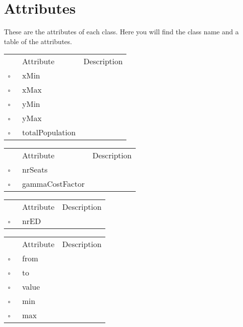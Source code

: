 \chapter{Attributes}
These are the attributes of each class. Here you will find the class name and a table of the attributes.     
\begin{table}
\caption{Area  }

\begin{longtable}{llp{8cm}}
& Attribute & Description \\
$\square$\ & xMin &  \\
$\square$\ & xMax &  \\
$\square$\ & yMin &  \\
$\square$\ & yMax &  \\
$\square$\ & totalPopulation &  \\
\end{longtable}
\label{attr:Area}
\end{table}

\clearpage
\begin{table}
\caption{ConstituencyType  }

\begin{longtable}{llp{8cm}}
& Attribute & Description \\
$\square$\ & nrSeats &  \\
$\square$\ & gammaCostFactor &  \\
\end{longtable}
\label{attr:ConstituencyType}
\end{table}

\begin{table}
\caption{County  }

\begin{longtable}{llp{8cm}}
& Attribute & Description \\
$\square$\ & nrED &  \\
\end{longtable}
\label{attr:County}
\end{table}

\begin{table}
\caption{Distance  }

\begin{longtable}{llp{8cm}}
& Attribute & Description \\
$\square$\ & from &  \\
$\square$\ & to &  \\
$\square$\ & value &  \\
$\square$\ & min &  \\
$\square$\ & max &  \\
\end{longtable}
\label{attr:Distance}
\end{table}

